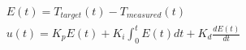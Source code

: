 \begin{gather*}
    \label{eqn:piderror}
    E(t)=T_{target}(t)-T_{measured}(t)\\
    \label{eqn:pid}
    u(t)=K_pE(t)+K_i\int_0^{t}E(t)dt+K_d\frac{dE(t)}{dt}\\
\end{gather*}

